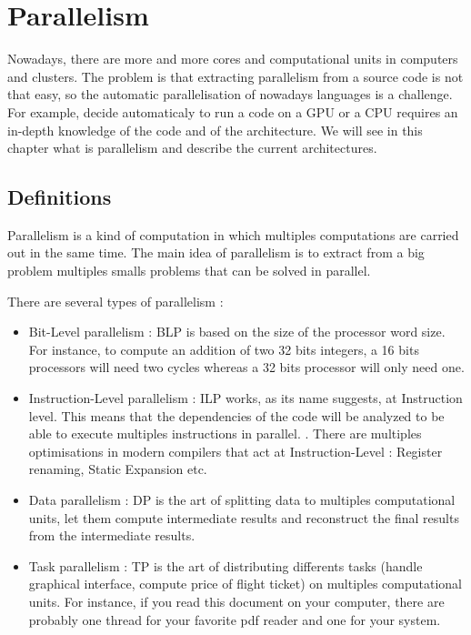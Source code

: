 \chapter{Parallelism}\label{ch:Parallelism}
Nowadays, there are more and more cores and computational units in computers and clusters. The problem is that extracting parallelism from a source code is not that easy, so the automatic parallelisation of nowadays languages is a challenge. For example, decide automaticaly to run a code on a GPU or a CPU requires an in-depth knowledge of the code and of the architecture. We will see in this chapter what is parallelism and describe the current architectures.

\section{Definitions}
Parallelism is a kind of computation in which multiples computations are carried out in the same time. The main idea of parallelism is to extract from a big problem multiples smalls problems that can be solved in parallel. 

There are several types of parallelism :
\begin{itemize}
\item Bit-Level parallelism : BLP is based on the size of the processor word size. For instance, to compute an addition of two 32 bits integers, a 16 bits processors will need two cycles whereas a 32 bits processor will only need one.
\item Instruction-Level parallelism : ILP works, as its name suggests, at Instruction level. This means that the dependencies of the code will be analyzed to be able to execute multiples instructions in parallel. . There are multiples optimisations in modern compilers that act at Instruction-Level : Register renaming, Static Expansion etc.
\item Data parallelism : DP is the art of splitting data to multiples computational units, let them compute intermediate results and reconstruct the final results from the intermediate results. 
\item Task parallelism : TP is the art of distributing differents tasks (handle graphical interface, compute price of flight ticket) on multiples computational units. For instance, if you read this document on your computer, there are probably one thread for your favorite pdf reader and one for your system. 
\end{itemize}

